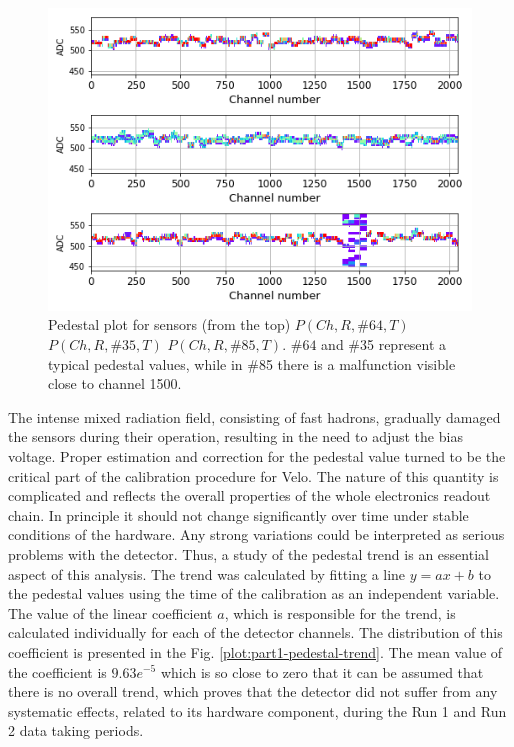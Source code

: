 \begin{figure}
    \centering
    \includegraphics[width=0.7\linewidth]{figures/chapter4/calib_analysis/Part1-outliers-pedestals-cases.png}
    \caption{Pedestal plot for sensors (from the top) $P(Ch, R, \#64, T)$ $P(Ch, R, \#35, T)$ $P(Ch, R, \#85, T)$. $\#64$ and \#35 represent a typical pedestal values, while in \#85 there is a malfunction visible close to channel 1500.}
    \label{plot:par1-pedestal-sensors}
\end{figure}

The intense mixed radiation field, consisting of fast hadrons, gradually damaged the sensors during their operation, resulting in the need to adjust the bias voltage.
Proper estimation and correction for the pedestal value turned to be the critical part of the calibration procedure for Velo. The nature of this quantity is complicated and reflects the overall properties of the whole electronics readout chain. In principle it should not change significantly over time under stable conditions of the hardware. Any strong variations could be interpreted as serious problems with the detector.
Thus, a study of the pedestal trend is an essential aspect of this analysis.
The trend was calculated by fitting a line $y=ax+b$ to the pedestal values using the time of the calibration as an independent variable.
The value of the linear coefficient $a$, which is responsible for the trend, is calculated individually for each of the detector channels.
The distribution of this coefficient is presented in the Fig. \ref{plot:part1-pedestal-trend}.
The mean value of the coefficient is $9.63e^{-5}$ which is so close to zero that it can be assumed that there is no overall trend, which proves that the detector did not suffer from any systematic effects, related to its hardware component, during the Run 1 and Run 2 data taking periods.

